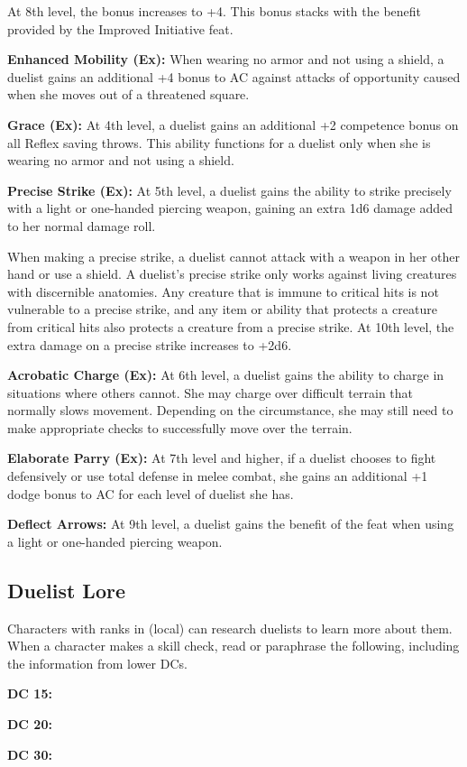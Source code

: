 At 8th level, the bonus increases to +4. This bonus stacks with the benefit provided by the Improved Initiative feat.

\textbf{Enhanced Mobility (Ex):} When wearing no armor and not using a shield, a duelist gains an additional +4 bonus to AC against attacks of opportunity caused when she moves out of a threatened square.

\textbf{Grace (Ex):} At 4th level, a duelist gains an additional +2 competence bonus on all Reflex saving throws. This ability functions for a duelist only when she is wearing no armor and not using a shield.

\textbf{Precise Strike (Ex):} At 5th level, a duelist gains the ability to strike precisely with a light or one-handed piercing weapon, gaining an extra 1d6 damage added to her normal damage roll.

When making a precise strike, a duelist cannot attack with a weapon in her other hand or use a shield. A duelist's precise strike only works against living creatures with discernible anatomies. Any creature that is immune to critical hits is not vulnerable to a precise strike, and any item or ability that protects a creature from critical hits also protects a creature from a precise strike. At 10th level, the extra damage on a precise strike increases to +2d6.

\textbf{Acrobatic Charge (Ex):} At 6th level, a duelist gains the ability to charge in situations where others cannot. She may charge over difficult terrain that normally slows movement. Depending on the circumstance, she may still need to make appropriate checks to successfully move over the terrain.

\textbf{Elaborate Parry (Ex):} At 7th level and higher, if a duelist chooses to fight defensively or use total defense in melee combat, she gains an additional +1 dodge bonus to AC for each level of duelist she has.

\textbf{Deflect Arrows:} At 9th level, a duelist gains the benefit of the  feat when using a light or one-handed piercing weapon.

\subsection{Duelist Lore}
Characters with ranks in  (local) can research duelists to learn more about them. When a character makes a skill check, read or paraphrase the following, including the information from lower DCs.

\textbf{DC 15:}

\textbf{DC 20:}

\textbf{DC 30:}